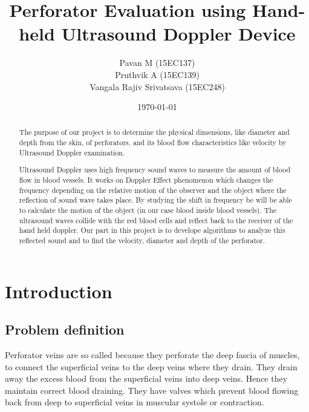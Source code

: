 \documentclass[BTech]{nitkdiss}
\title{Perforator Evaluation using Hand-held Ultrasound Doppler Device}
\author{Pavan M (15EC137)\\ Pruthvik A (15EC139)\\ Vangala Rajiv Srivatsava (15EC248)\\}
\date{\today}
\begin{document}
\maketitle

\newpage
\begin{abstract}

\hspace{0.4cm} The purpose of our project is to determine the physical dimensions, like diameter and depth from the skin, of  perforators, and its blood flow characteristics like velocity by Ultrasound Doppler examination.

Ultrasound Doppler uses high frequency sound waves to measure the amount of blood flow in blood vessels. It works on Doppler Effect phenomenon which changes the frequency depending on the relative motion of the observer and the object where the reflection of sound wave takes place. By studying the shift in frequency be will be able to calculate the motion of the object (in our case blood inside blood vessels). The ultrasound waves collide with the red blood cells and reflect back to the receiver of the hand held doppler. Our part in this project is to develope algorithms to analyze this reflected sound and to find the velocity, diameter and depth of the perforator.
\end{abstract}

\newpage
\tableofcontents
\listoffigures
\listoftables
\newpage
\pagestyle{plain}

\chapter{Introduction}           

\section{ Problem definition } 
\hspace{0.4cm}Perforator veins are so called because they perforate the deep fascia of muscles, to connect the superficial veins to the deep veins where they drain. They drain away the excess blood from the superficial veins into deep veins. Hence they maintain correct blood draining. They have valves which prevent blood flowing back from deep to superficial veins in muscular systole or contraction.
\end{document}
